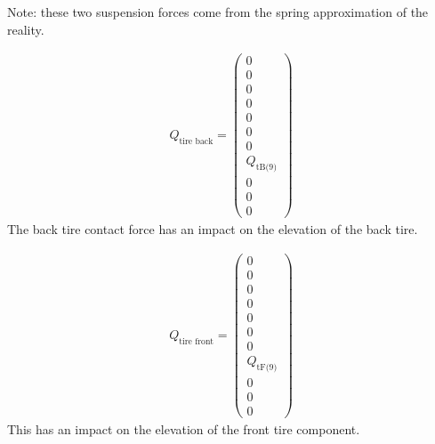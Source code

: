 Note: these two suspension forces come from the spring approximation of the reality.

\begin{equation}
    \begin{split}
        Q_\text{tire back} = \begin{pmatrix}
            0\\
            0\\
            0\\
            0\\
            0\\
            0\\
            0\\
            Q_\text{tB(9)}\\
            0\\
            0\\
            0
        \end{pmatrix}
    \end{split}
\end{equation}
The back tire contact force has an impact on the elevation of the back tire.

\begin{equation}
    \begin{split}
        Q_\text{tire front} = \begin{pmatrix}
            0\\
            0\\
            0\\
            0\\
            0\\
            0\\
            0\\
            Q_\text{tF(9)}\\
            0\\
            0\\
            0
        \end{pmatrix}
    \end{split}
\end{equation}
This has an impact on the elevation of the front tire component.
